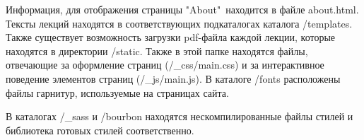 Информация, для отображения страницы "About"\ находится в файле about.html. Тексты лекций находятся в соответствующих подкаталогах каталога /templates. Также существует возможность загрузки pdf-файла каждой лекции, которые находятся в директории /static. Также в этой папке находятся файлы, отвечающие за оформление страниц (/\_css/main.css) и за интерактивное поведение элементов страниц (/\_js/main.js). В каталоге /fonts расположены файлы гарнитур, используемые на страницах сайта.

В каталогах /\_sass и /bourbon находятся нескомпилированные файлы стилей и библиотека готовых стилей соответственно. 